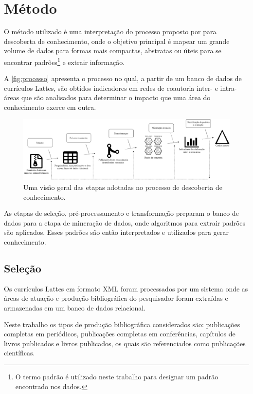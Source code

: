 \chapter[Método]{Método}

O método utilizado é uma interpretação do processo proposto por  para descoberta de conhecimento, onde o objetivo principal é mapear um grande volume de dados para formas mais compactas, abstratas ou úteis para se encontrar padrões\footnote{O termo padrão é utilizado neste trabalho para designar um padrão encontrado nos dados.} e extrair informação.

A \autoref{fig:processo} apresenta o processo no qual, a partir de um banco de dados de currículos Lattes, são obtidos indicadores em redes de coautoria inter- e intra-áreas que são analisados para determinar o impacto que uma área do conhecimento exerce em outra.

\begin{figure}[htpb]
  \centering
  \includegraphics[width=1\textwidth]{figuras/diagrama-fayyad}
  \caption{Uma visão geral das etapas adotadas no processo de descoberta de conhecimento.}
  \label{fig:processo}
\end{figure}

As etapas de seleção, pré-processamento e transformação preparam o banco de dados para a etapa de mineração de dados, onde algoritmos para extrair padrões são aplicados. Esses padrões são então interpretados e utilizados para gerar conhecimento.

\section{Seleção}

Os currículos Lattes em formato XML foram processados por um sistema onde as áreas de atuação e produção bibliográfica do pesquisador foram extraídas e armazenadas em um banco de dados relacional.

Neste trabalho os tipos de produção bibliográfica considerados são: publicações completas em periódicos, publicações completas em conferências, capítulos de livros publicados e livros publicados, os quais são referenciados como publicações científicas.

